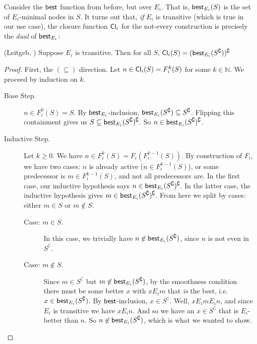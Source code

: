 \documentclass[letterpaper]{article}
\begin{document}
    Consider the $\mathsf{best}$ function from before, but over $E_i$.  That is, $\mathsf{best}_{E_i}(S)$ is the set of $E_i$-minimal nodes in $S$.  It turns out that, \emph{if} $E_i$ is transitive (which is true in our use case), the closure function $\mathsf{Cl}_i$ for the not-every construction is precisely the \emph{dual} of $\mathsf{best}_{E_i}$:
    \begin{claim*} (Leitgeb, \cite{leitgeb2001nonmonotonic})
        Suppose $E_i$ is transitive.  Then for all $S$, $\mathsf{Cl}_i(S) = (\mathsf{best}_{E_i}(S^\complement))^\complement$
    \end{claim*}
    \begin{proof}
        First, the $(\subseteq)$ direction.  Let $n \in \mathsf{Cl}_i(S) = F^k_i(S)$ for some $k \in \mathbb{N}$.  We proceed by induction on $k$.
        \begin{description}
            \item[Base Step.] $n \in F^0_i(S) = S$.  By $\mathsf{best}_{E_i}$-inclusion, $\mathsf{best}_{E_i}(S^\complement) \subseteq S^\complement$. Flipping this containment gives us $S \subseteq \mathsf{best}_{E_i}(S^\complement)^\complement$.  So $n \in \mathsf{best}_{E_i}(S^\complement)^\complement$.
            
            \item[Inductive Step.] Let $k \geq 0$.  We have $n \in F^k_i(S) = F_i(F^{k-1}_i(S))$.  By construction of $F_i$, we have two cases: $n$ is already active ($n \in F^{k-1}_i(S)$), or some predecessor is $m \in F^{k-1}_i(S)$, and not all predecessors are.  In the first case, our inductive hypothesis says $n \in \mathsf{best}_{E_i}(S^\complement)^\complement$.  In the latter case, the inductive hypothesis gives $m \in \mathsf{best}_{E_i}(S^\complement)^\complement$.  From here we split by cases: either $m \in S$ or $m \not \in S$.
            \begin{description}
                \item[Case: $m \in S$.] In this case, we trivially have $n \not \in \mathsf{best}_{E_i}(S^\complement)$, since $n$ is not even in $S^\complement$.

                \item[Case: $m \not \in S$.]
                Since $m \in S^\complement$ but $m \not \in \mathsf{best}_{E_i}(S^\complement)$, by the smoothness condition there must be some better $x$ with $x{E_i}m$ that \emph{is} the best, i.e. $x \in \mathsf{best}_{E_i}(S^\complement)$.  By $\mathsf{best}$-inclusion, $x \in S^\complement$.  Well, $x{E_i}m{E_i}n$, and since $E_i$ is transitive we have $x{E_i}n$.  And so we have an $x \in S^\complement$ that is $E_i$-better than $n$.  So $n \not \in \mathsf{best}_{E_i}(S^\complement)$, which is what we wanted to show.
            \end{description}
        \end{description}


\end{proof}
\end{document}
